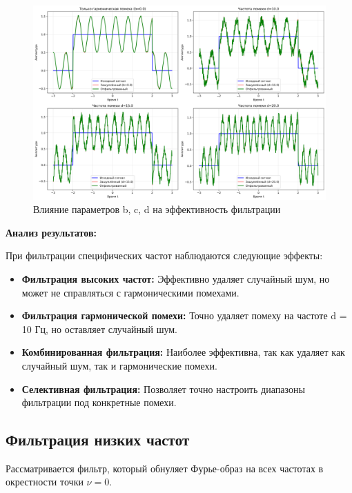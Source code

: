 \begin{figure}[H]
\centering
\includegraphics[width=\textwidth]{images/task1/specific_freq_filter_parameters.png}
\caption{Влияние параметров b, c, d на эффективность фильтрации}
\end{figure}

\textbf{Анализ результатов:}

При фильтрации специфических частот наблюдаются следующие эффекты:

\begin{itemize}
    \item \textbf{Фильтрация высоких частот:} Эффективно удаляет случайный шум, но может не справляться с гармоническими помехами.
    
    \item \textbf{Фильтрация гармонической помехи:} Точно удаляет помеху на частоте d = 10 Гц, но оставляет случайный шум.
    
    \item \textbf{Комбинированная фильтрация:} Наиболее эффективна, так как удаляет как случайный шум, так и гармонические помехи.
    
    \item \textbf{Селективная фильтрация:} Позволяет точно настроить диапазоны фильтрации под конкретные помехи.
\end{itemize}

\subsection*{Фильтрация низких частот}

Рассматривается фильтр, который обнуляет Фурье-образ на всех частотах в окрестности точки $\nu = 0$.

